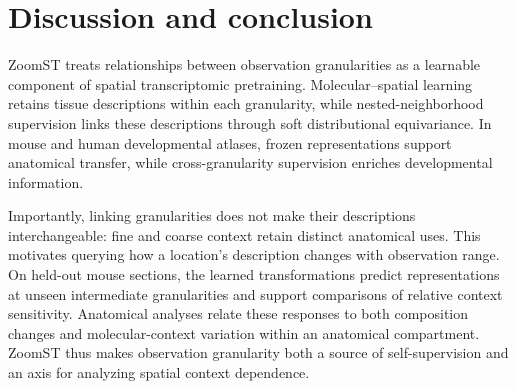 \section{Discussion and conclusion}

ZoomST treats relationships between observation granularities as a
learnable component of spatial transcriptomic pretraining.
Molecular--spatial learning retains tissue descriptions within each
granularity, while nested-neighborhood supervision links these
descriptions through soft distributional equivariance.
In mouse and human developmental atlases, frozen representations
support anatomical transfer, while cross-granularity supervision
enriches developmental information.

Importantly, linking granularities does not make their descriptions
interchangeable: fine and coarse context retain distinct anatomical uses.
This motivates querying how a location's description changes with
observation range.
On held-out mouse sections, the learned transformations predict
representations at unseen intermediate granularities and support
comparisons of relative context sensitivity.
Anatomical analyses relate these responses to both composition changes
and molecular-context variation within an anatomical compartment.
ZoomST thus makes observation granularity both a source of
self-supervision and an axis for analyzing spatial context dependence.
